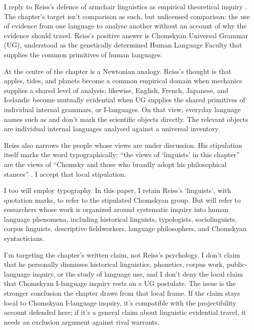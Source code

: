 \documentclass[12pt]{article}
\begin{document}
I reply to Reiss's defence of armchair linguistics as empirical theoretical inquiry \citep{reiss2026armchair}. The chapter's target isn't comparison as such, but unlicensed comparison: the use of evidence from one language to analyse another without an account of why the evidence should travel. Reiss's positive answer is Chomskyan Universal Grammar (UG), understood as the genetically determined Human Language Faculty that supplies the common primitives of human languages.

At the centre of the chapter is a Newtonian analogy. Reiss's thought is that apples, tides, and planets become a common empirical domain when mechanics supplies a shared level of analysis; likewise, English, French, Japanese, and Icelandic become mutually evidential when UG supplies the shared primitives of individual internal grammars, or I-languages. On that view, everyday language names such as  and  don't mark the scientific objects directly. The relevant objects are individual internal languages analysed against a universal inventory.

Reiss also narrows the people whose views are under discussion. His stipulation itself marks the word typographically: \enquote{the views of `linguists' in this chapter} are the views of \enquote{Chomsky and those who broadly adopt his philosophical stances} \citep[sec.~2]{reiss2026armchair}. I accept that local stipulation.

I too will employ typography. In this paper, I retain Reiss's `linguists', with quotation marks, to refer to the stipulated Chomskyan group. But  will refer to researchers whose work is organized around systematic inquiry into human language phenomena, including historical linguists, typologists, sociolinguists, corpus linguists, descriptive fieldworkers, language philosophers, and Chomskyan syntacticians.

I'm targeting the chapter's written claim, not Reiss's psychology. I don't claim that he personally dismisses historical linguistics, phonetics, corpus work, public-language inquiry, or the study of language use, and I don't deny the local claim that Chomskyan I-language inquiry rests on a UG postulate. The issue is the stronger conclusion the chapter draws from that local frame. If the claim stays local to Chomskyan I-language inquiry, it's compatible with the projectibility account defended here; if it's a general claim about linguistic evidential travel, it needs an exclusion argument against rival warrants.
\end{document}
